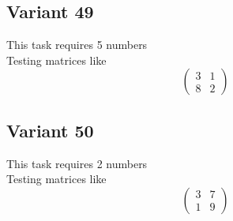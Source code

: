 \documentclass[11pt]{article}
\begin{document}
\subsection*{Variant 49}
This task requires 5 numbers\\
Testing matrices like \[ \begin{pmatrix} 3 & 1\\ 8 & 2 \end{pmatrix} \]

\subsection*{Variant 50}
This task requires 2 numbers\\
Testing matrices like \[ \begin{pmatrix} 3 & 7\\ 1 & 9 \end{pmatrix} \]
\end{document}
